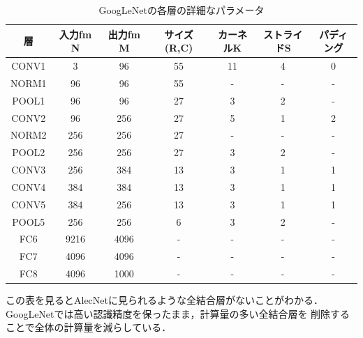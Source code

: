 {\begin{table}[ht]
 \begin{center}
  \caption{GoogLeNetの各層の詳細なパラメータ}
   \begin{tabular}{|c|c|c|c|c|c|c|} \hline
     層 & 入力fm N & 出力fm M & サイズ(R,C) & カーネルK & ストライドS & パディング \\ \hline
     CONV1 & 3 & 96 & 55 & 11 & 4 & 0 \\
     NORM1 & 96 & 96 & 55 & - & - & - \\
     POOL1 & 96 & 96 & 27 & 3 & 2 & - \\
     CONV2 & 96 & 256 & 27 & 5 & 1 & 2 \\
     NORM2 & 256 & 256 & 27 & - & - & - \\
     POOL2 & 256 & 256 & 27 & 3 & 2 & - \\
     CONV3 & 256 & 384 & 13 & 3 & 1 & 1\\
     CONV4 & 384 & 384 & 13 & 3 & 1 & 1\\
     CONV5 & 384 & 256 & 13 & 3 & 1 & 1\\
     POOL5 & 256 & 256 & 6 & 3 & 2 & - \\
     FC6 & 9216 & 4096 & - & - & - & - \\
     FC7 & 4096 & 4096 & - & - & - & - \\
     FC8 & 4096 & 1000 & - & - & - & - \\ \hline
  \end{tabular}
  \label{googlenet_params}  
 \end{center}
\end{table}

この表を見るとAlecNetに見られるような全結合層がないことがわかる．GoogLeNetでは高い認識精度を保ったまま，計算量の多い全結合層を
削除することで全体の計算量を減らしている．
}